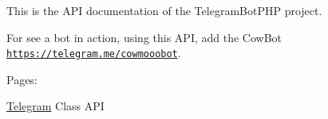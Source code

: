 \-This is the \-A\-P\-I documentation of the \-Telegram\-Bot\-P\-H\-P project.\par
 \-For see a bot in action, using this \-A\-P\-I, add the \-Cow\-Bot \href{https://telegram.me/cowmooobot}{\tt https\-://telegram.\-me/cowmooobot}.\par
 \-Pages\-:\par
 \hyperlink{class_telegram}{\-Telegram} \-Class \-A\-P\-I \par
 